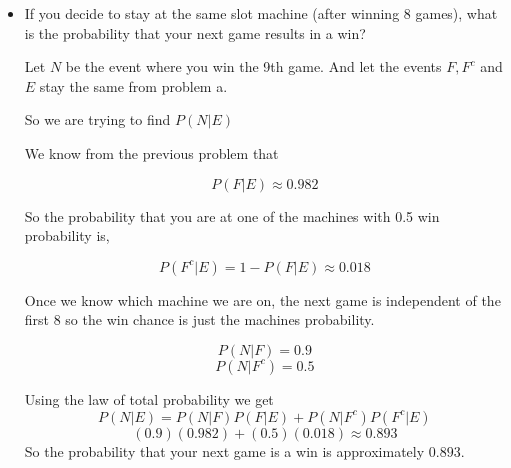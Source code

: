 \documentclass[10pt,letterpaper,unboxed,cm]{article}
\begin{document}
\begin{enumerate}
\begin{itemize}
Let \(F\) be the event where you picked the machine with .9 win probability, thus \(F^c\) is the event where you picked one of the two machines with .5 win probability

Also let\(E\) be the event where you won all 8 games

So we are trying to find 

\[P(F|E)\]

Since the games are independent we can multiply the win chances 8 times given the machine we are on

\[P(E|F) = (.9)^8 \approx 0.4305\]
\[P(E|F^c)=(0.5)^8 \approx 0.00390625\]

Now we will use the law of total probability to find the probability of 8 wins overall

\[P(E) = P(E|F)P(F)+P(E|F^c)P(F^c)\]
\[=(0.9)^8(\frac{1}{3})+(0.5)^8(\frac{2}{3})=0.14609\]

Now we can use bayes theorem
\[P(F \mid E) = \frac{P(E \mid F)P(F)}{P(E)}\]

\[\frac{(0.9)^8(\frac{1}{3})}{(0.9)^8(\frac{1}{3})+(0.5)^8(\frac{2}{3})}  \approx0.982\]

So the probability that you are at the 0.9 machine is approximately \(0.982\).

\item
If you decide to stay at the same slot machine (after winning 8 games), what is the
probability that your next game results in a win?

Let \(N\) be the event where you win the 9th game. And let the events \(F,F^c \) and \(E\) stay the same from problem a.

So we are trying to find \(P(N|E)\)

We know from the previous problem that 

\[P(F|E) \approx 0.982\]

So the probability that you are at one of the machines with 0.5 win probability is,

\[P(F^c|E)=1-P(F|E) \approx 0.018\]

Once we know which machine we are on, the next game is independent of the first 8 so the win chance is just the machines probability.

\[P(N|F) = 0.9\]
\[P(N|F^c) = 0.5\]

Using the law of total probability we get
\[P(N|E) = P(N|F)P(F|E)+P(N|F^c)P(F^c|E)\]
\[(0.9)(0.982)+(0.5)(0.018) \approx0.893\]
So the probability that your next game is a win is approximately \(0.893\).
\end{itemize}


\end{enumerate}
\end{document}

